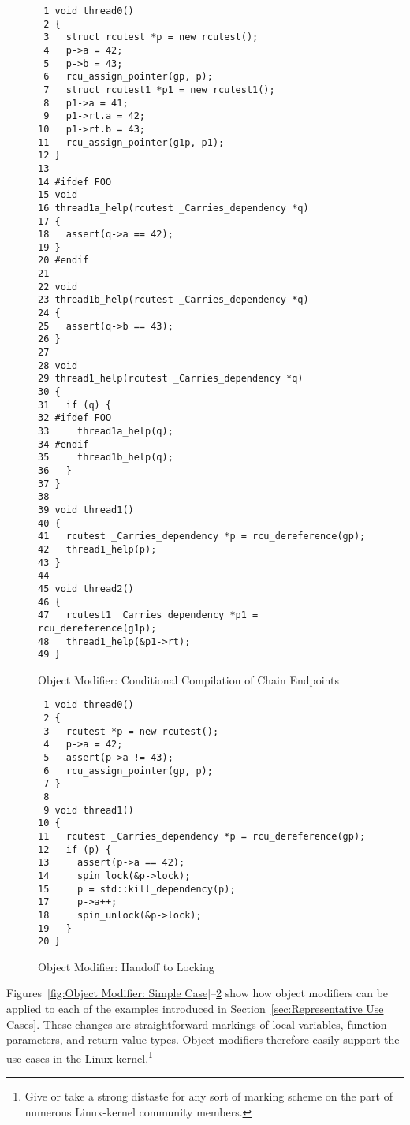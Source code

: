 \begin{figure}[tbp]
{ \scriptsize
\begin{verbatim}
 1 void thread0()
 2 {
 3   struct rcutest *p = new rcutest();
 4   p->a = 42;
 5   p->b = 43;
 6   rcu_assign_pointer(gp, p);
 7   struct rcutest1 *p1 = new rcutest1();
 8   p1->a = 41;
 9   p1->rt.a = 42;
10   p1->rt.b = 43;
11   rcu_assign_pointer(g1p, p1);
12 }
13
14 #ifdef FOO
15 void
16 thread1a_help(rcutest _Carries_dependency *q)
17 {
18   assert(q->a == 42);
19 }
20 #endif
21
22 void
23 thread1b_help(rcutest _Carries_dependency *q)
24 {
25   assert(q->b == 43);
26 }
27
28 void
29 thread1_help(rcutest _Carries_dependency *q)
30 {
31   if (q) {
32 #ifdef FOO
33     thread1a_help(q);
34 #endif
35     thread1b_help(q);
36   }
37 }
38
39 void thread1()
40 {
41   rcutest _Carries_dependency *p = rcu_dereference(gp);
42   thread1_help(p);
43 }
44
45 void thread2()
46 {
47   rcutest1 _Carries_dependency *p1 = rcu_dereference(g1p);
48   thread1_help(&p1->rt);
49 }
\end{verbatim}
}
\caption{Object Modifier: Conditional Compilation of Chain Endpoints}
\label{fig:Object Modifier: Conditional Compilation of Chain Endpoints}
\end{figure}

\begin{figure}[tbp]
{ \scriptsize
\begin{verbatim}
 1 void thread0()
 2 {
 3   rcutest *p = new rcutest();
 4   p->a = 42;
 5   assert(p->a != 43);
 6   rcu_assign_pointer(gp, p);
 7 }
 8
 9 void thread1()
10 {
11   rcutest _Carries_dependency *p = rcu_dereference(gp);
12   if (p) {
13     assert(p->a == 42);
14     spin_lock(&p->lock);
15     p = std::kill_dependency(p);
17     p->a++;
18     spin_unlock(&p->lock);
19   }
20 }
\end{verbatim}
}
\caption{Object Modifier: Handoff to Locking}
\label{fig:Object Modifier: Handoff to Locking}
\end{figure}

Figures~\ref{fig:Object Modifier: Simple Case}--\ref{fig:Object Modifier: Handoff to Locking}
show how object modifiers can be applied to each of the examples
introduced in Section~\ref{sec:Representative Use Cases}.
These changes are straightforward markings of local variables, function
parameters, and return-value types.
Object modifiers therefore easily support the use cases in the Linux
kernel.\footnote{
	Give or take a strong distaste for any sort of marking scheme
	on the part of numerous Linux-kernel community members.}
